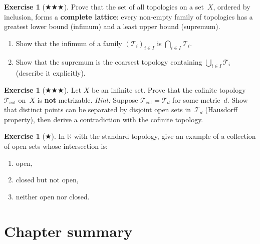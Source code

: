 \documentclass[11pt,a4paper,twoside]{book}
\theoremstyle{remark}
\theoremstyle{definition}
\newtheorem{exerciseplain}[theorem]{Exercise}
\theoremstyle{definition}
\newenvironment{exercise}[1][]{%
  \begin{exerciseplain}[#1]
}{%
  \end{exerciseplain}
}
\newcommand{\Tau}{\mathcal{T}}           %
\newcommand{\R}{\mathbb{R}}
\begin{document}
\begin{exercise}[$\bigstar\!\bigstar\!\bigstar$]
\label{exer:ch1:7}
Prove that the set of all topologies on a set~$X$, ordered by inclusion, forms
a \textbf{complete lattice}: every non-empty family of topologies has a
greatest lower bound (infimum) and a least upper bound (supremum).
\begin{enumerate}[label=(\alph*)]
  \item Show that the infimum of a family $(\Tau_i)_{i\in I}$ is
        $\bigcap_{i\in I}\Tau_i$.
  \item Show that the supremum is the coarsest topology containing
        $\bigcup_{i\in I}\Tau_i$ (describe it explicitly).
\end{enumerate}
\end{exercise}

\begin{exercise}[$\bigstar\!\bigstar\!\bigstar$]
\label{exer:ch1:8}
Let $X$ be an infinite set.  Prove that the cofinite topology $\Tau_{\mathrm{cof}}$
on~$X$ is \textbf{not} metrizable.
\emph{Hint:} Suppose $\Tau_{\mathrm{cof}}=\Tau_d$ for some metric~$d$.  Show
that distinct points can be separated by disjoint open sets in~$\Tau_d$
(Hausdorff property), then derive a contradiction with the cofinite topology.
\end{exercise}

\begin{exercise}[$\bigstar$]
\label{exer:ch1:9}
In $\R$ with the standard topology, give an example of a collection of open
sets whose intersection is:
\begin{enumerate}[label=(\alph*)]
  \item open,
  \item closed but not open,
  \item neither open nor closed.
\end{enumerate}
\end{exercise}


\section*{Chapter summary}
\end{document}
